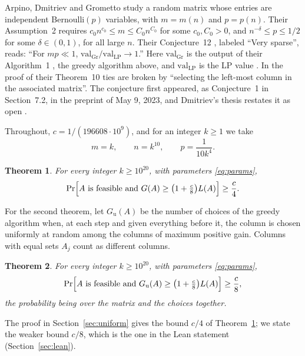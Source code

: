 \documentclass[11pt]{article}
\newtheorem{theorem}{Theorem}
\theoremstyle{remark}
\newcommand{\Gu}{G_{\mathrm u}}
\begin{document}
Arpino, Dmitriev and Grometto \cite{ADG} study a random matrix whose
entries are independent Bernoulli$(p)$ variables, with $m=m(n)$ and
$p=p(n)$. Their Assumption~2 \cite[p.~30:3]{ADG} requires
$c_0n^{c_0}\le m\le C_0n^{C_0}$ for some $c_0,C_0>0$, and $n^{-\delta}\le p\le1/2$ for
some $\delta\in(0,1)$, for all large $n$. Their Conjecture~12
\cite[Section~6.2, p.~30:13]{ADG}, labeled ``Very sparse'', reads: ``For
$mp\ll1$, $\mathrm{val}_{\mathrm{Gr}}/\mathrm{val}_{\mathrm{LP}}\to1$.''
Here $\mathrm{val}_{\mathrm{Gr}}$ is the output of their Algorithm~1
\cite[p.~30:7]{ADG}, the greedy algorithm above, and
$\mathrm{val}_{\mathrm{LP}}$ is the LP value \cite[equation~(1.2)]{ADG}.
In the proof of their Theorem~10 \cite[p.~30:11]{ADG} ties are broken by
``selecting the left-most column in the associated matrix''. The
conjecture first appeared, as Conjecture~1 in Section~7.2, in the preprint
\cite{ADGarxiv} of May 9, 2023, and Dmitriev's thesis restates it as open
\cite[Conjecture~6.1(1)]{Dmitriev}.

Throughout, $c=1/(196608\cdot10^9)$, and for an integer $k\ge1$ we take
\begin{equation}\label{eq:params}
 m=k,\qquad n=k^{10},\qquad p=\frac1{10k^4}.
\end{equation}

\begin{theorem}\label{thm:leftmost}
For every integer $k\ge10^{20}$, with parameters \eqref{eq:params},
\[
 \Pr\Bigl[A\text{ is feasible and }G(A)\ge\bigl(1+\tfrac c8\bigr)L(A)\Bigr]
 \ge\frac c4 .
\]
\end{theorem}

For the second theorem, let $\Gu(A)$ be the number of choices of the greedy
algorithm when, at each step and given everything before it, the column is
chosen uniformly at random among the columns of maximum positive gain.
Columns with equal sets $A_j$ count as different columns.

\begin{theorem}\label{thm:uniform}
For every integer $k\ge10^{20}$, with parameters \eqref{eq:params},
\[
 \Pr\Bigl[A\text{ is feasible and }\Gu(A)\ge\bigl(1+\tfrac c8\bigr)L(A)\Bigr]
 \ge\frac c8 ,
\]
the probability being over the matrix and the choices together.
\end{theorem}

The proof in Section~\ref{sec:uniform} gives the bound $c/4$ of
Theorem~\ref{thm:leftmost}; we state the weaker bound $c/8$, which is the
one in the Lean statement (Section~\ref{sec:lean}).
\end{document}
